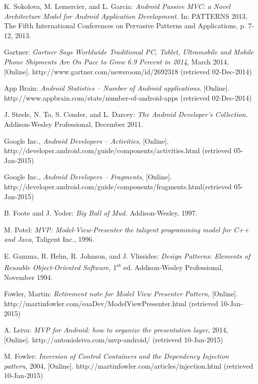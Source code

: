 \begin{thebibliography}{1}

K. Sokolova, M. Lemercier, and L. Garcia: \emph{Android Passive MVC: a Novel Architecture Model for Android Application Development.} In: PATTERNS 2013, The Fifth International Conferences on Pervasive Patterns and Applications, p. 7-12, 2013.

Gartner: \emph{Gartner Says Worldwide Traditional PC, Tablet, Ultramobile and 
Mobile Phone Shipments Are On Pace to Grow 6.9 Percent in 2014}, March 2014, 
[Online]. http://www.gartner.com/newsroom/id/2692318 (retrieved 02-Dec-2014)

App Brain: \emph{Android Statistics -- Number of Android applications}. 
[Online].
http://www.appbrain.com/stats/number-of-android-apps (retrieved 02-Dec-2014)

J. Steele, N. To, S. Conder, and L. Darcey: \emph{The Android Developer's Collection.} Addison-Wesley Professional, December 2011.

Google Inc., \emph{Android Developers -- Activities},
[Online]. http://developer.android.com/guide/components/activities.html (retrieved 05-Jan-2015)

Google Inc., \emph{Android Developers -- Fragments},
[Online]. http://developer.android.com/guide/components/fragments.html(retrieved 05-Jan-2015)

B. Foote and J. Yoder: \emph{Big Ball of Mud.} Addison-Wesley, 1997.

M. Potel: \emph{MVP: Model-View-Presenter the taligent programming model for C++ and Java}, Taligent Inc., 1996.

E. Gamma, R. Helm, R. Johnson, and J. Vlissides: \emph{Design Patterns: Elements of Reusable Object-Oriented Software,} 1\textsuperscript{st} ed. Addison-Wesley Professional, November 1994.

Fowler, Martin: \emph{Retirement note for Model View Presenter Pattern},
[Online]. http://martinfowler.com/eaaDev/ModelViewPresenter.html (retrieved 10-Jan-2015)

A. Leiva: \emph{MVP for Android: how to organize the presentation layer}, 2014,
[Online]. http://antonioleiva.com/mvp-android/ (retrieved 10-Jan-2015)

M. Fowler: \emph{Inversion of Control Containers and the Dependency Injection pattern}, 2004,
[Online]. http://martinfowler.com/articles/injection.html (retrieved 10-Jan-2015)


\end{thebibliography}

